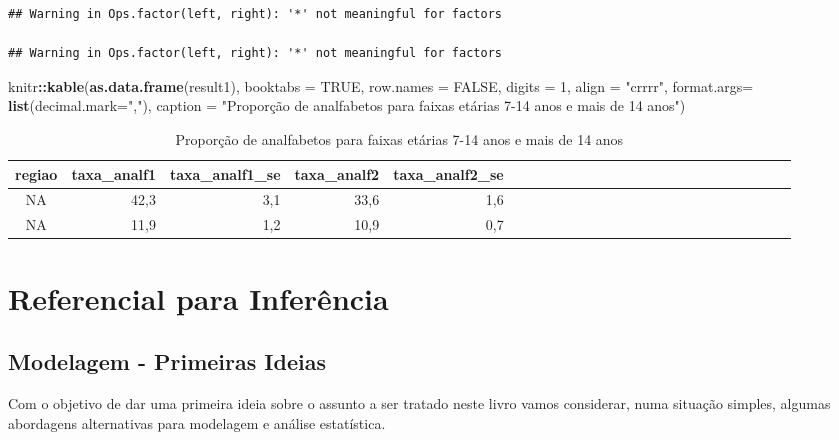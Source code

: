 \documentclass[]{book}
\newenvironment{Shaded}{\begin{snugshade}}{\end{snugshade}}
\newcommand{\KeywordTok}[1]{\textcolor[rgb]{0.13,0.29,0.53}{\textbf{#1}}}
\newcommand{\DataTypeTok}[1]{\textcolor[rgb]{0.13,0.29,0.53}{#1}}
\newcommand{\DecValTok}[1]{\textcolor[rgb]{0.00,0.00,0.81}{#1}}
\newcommand{\StringTok}[1]{\textcolor[rgb]{0.31,0.60,0.02}{#1}}
\newcommand{\OtherTok}[1]{\textcolor[rgb]{0.56,0.35,0.01}{#1}}
\newcommand{\OperatorTok}[1]{\textcolor[rgb]{0.81,0.36,0.00}{\textbf{#1}}}
\newcommand{\NormalTok}[1]{#1}
\theoremstyle{definition}
\theoremstyle{definition}
\theoremstyle{definition}
\theoremstyle{remark}
\begin{document}
\begin{verbatim}
## Warning in Ops.factor(left, right): '*' not meaningful for factors

## Warning in Ops.factor(left, right): '*' not meaningful for factors
\end{verbatim}

\begin{Shaded}
\begin{Highlighting}[]
\NormalTok{knitr}\OperatorTok{::}\KeywordTok{kable}\NormalTok{(}\KeywordTok{as.data.frame}\NormalTok{(result1), }\DataTypeTok{booktabs =} \OtherTok{TRUE}\NormalTok{, }\DataTypeTok{row.names =} \OtherTok{FALSE}\NormalTok{, }\DataTypeTok{digits =} \DecValTok{1}\NormalTok{,}
             \DataTypeTok{align =} \StringTok{"crrrr"}\NormalTok{, }\DataTypeTok{format.args=} \KeywordTok{list}\NormalTok{(}\DataTypeTok{decimal.mark=}\StringTok{","}\NormalTok{),}
\DataTypeTok{caption =} \StringTok{"Proporção de analfabetos para faixas etárias 7-14 anos e mais de 14 anos"}\NormalTok{)}
\end{Highlighting}
\end{Shaded}

\begin{table}

\caption{\label{tab:unnamed-chunk-12}Proporção de analfabetos para faixas etárias 7-14 anos e mais de 14 anos}
\centering
\begin{tabular}[t]{crrrrcrrrrcrrrrcrrrrcrrrr}
\toprule
regiao & taxa\_analf1 & taxa\_analf1\_se & taxa\_analf2 & taxa\_analf2\_se\\
\midrule
NA & 42,3 & 3,1 & 33,6 & 1,6\\
NA & 11,9 & 1,2 & 10,9 & 0,7\\
\bottomrule
\end{tabular}
\end{table}

\chapter{Referencial para Inferência}\label{refinf}

\section{Modelagem - Primeiras Ideias}\label{classic}

Com o objetivo de dar uma primeira ideia sobre o assunto a ser tratado
neste livro vamos considerar, numa situação simples, algumas abordagens
alternativas para modelagem e análise estatística.
\end{document}
